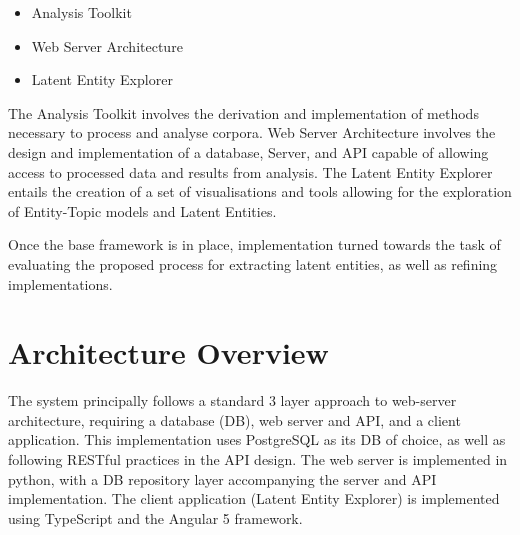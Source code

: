 \documentclass[10pt]{report}
\begin{document}
\renewcommand{\baselinestretch}{0.5}\normalsize
\begin{itemize}
\item Analysis Toolkit
\item Web Server Architecture
\item Latent Entity Explorer
\end{itemize}
\renewcommand{\baselinestretch}{2.0}\normalsize
The Analysis Toolkit involves the derivation and implementation of methods necessary to process and analyse corpora. Web Server Architecture involves the design and implementation of a database, Server, and API capable of allowing access to processed data and results from analysis. The Latent Entity Explorer entails the creation of a set of visualisations and tools allowing for the exploration of Entity-Topic models and Latent Entities.

Once the base framework is in place, implementation turned towards the task of evaluating the proposed process for extracting latent entities, as well as refining implementations.

\section{Architecture Overview}
The system principally follows a standard 3 layer approach to web-server architecture, requiring a database (DB), web server and API, and a client application. This implementation uses PostgreSQL as its DB of choice, as well as following RESTful practices in the API design. The web server is implemented in python, with a DB repository layer accompanying the server and API implementation. The client application (Latent Entity Explorer) is implemented using TypeScript and the Angular 5 framework.
\end{document}
